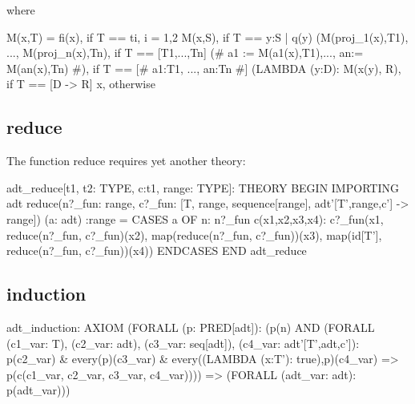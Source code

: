 where

M(x,T) = fi(x),		if T == ti, i = 1,2
         M(x,S),	if T == {y:S | q(y)}
         (M(proj_1(x),T1), ..., M(proj_n(x),Tn), if T == [T1,...,Tn]
         (# a1 := M(a1(x),T1),..., an:= M(an(x),Tn) #),
                        if T == [# a1:T1, ..., an:Tn #]
         (LAMBDA (y:D): M(x(y), R), if T == [D -> R]
       	 x,		otherwise


\subsection{reduce}

The function reduce requires yet another theory:

adt_reduce[t1, t2: TYPE, c:t1, range: TYPE]: THEORY
 BEGIN
  IMPORTING adt
  reduce(n?_fun: range,
         c?_fun: [T, range, sequence[range], adt'[T',range,c'] -> range])
        (a: adt) :range =
    CASES a OF
      n: n?_fun
      c(x1,x2,x3,x4):
        c?_fun(x1,
               reduce(n?_fun, c?_fun)(x2),
               map(reduce(n?_fun, c?_fun))(x3),
	       map(id[T'], reduce(n?_fun, c?_fun))(x4))
    ENDCASES
 END adt_reduce

\subsection{induction}

adt_induction: AXIOM
  (FORALL (p: PRED[adt]):
    (p(n) AND
      (FORALL (c1_var: T), (c2_var: adt), (c3_var: seq[adt]),
             (c4_var: adt'[T',adt,c']):
        p(c2_var) & every(p)(c3_var) & every((LAMBDA (x:T'): true),p)(c4_var)
	  => p(c(c1_var, c2_var, c3_var, c4_var))))
       => (FORALL (adt_var: adt): p(adt_var)))
